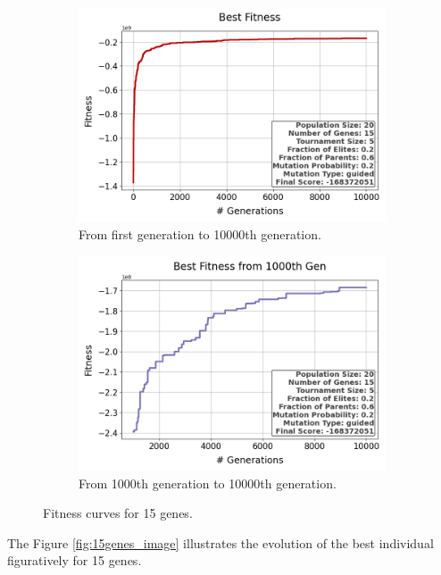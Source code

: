 \documentclass{assignment}
\begin{document}
\begin{figure}[h!]
    \begin{subfigure}{0.5\textwidth}
        \includegraphics[width=\textwidth]{figures/best_fitness_output_20_15_5_0.2_0.6_0.2_guided.png}
        \caption{From first generation to 10000th generation.}
    \end{subfigure}\hfill
    \begin{subfigure}{0.5\textwidth}
        \includegraphics[width=\textwidth]{figures/best_fitness_1000_output_20_15_5_0.2_0.6_0.2_guided.png}
        \caption{From 1000th generation to 10000th generation.}
    \end{subfigure}
    \caption{Fitness curves for 15 genes.}
\label{fig:15genes}
\end{figure}

The Figure \ref{fig:15genes_image} illustrates the evolution of the best individual figuratively for 15 genes.
\end{document}
